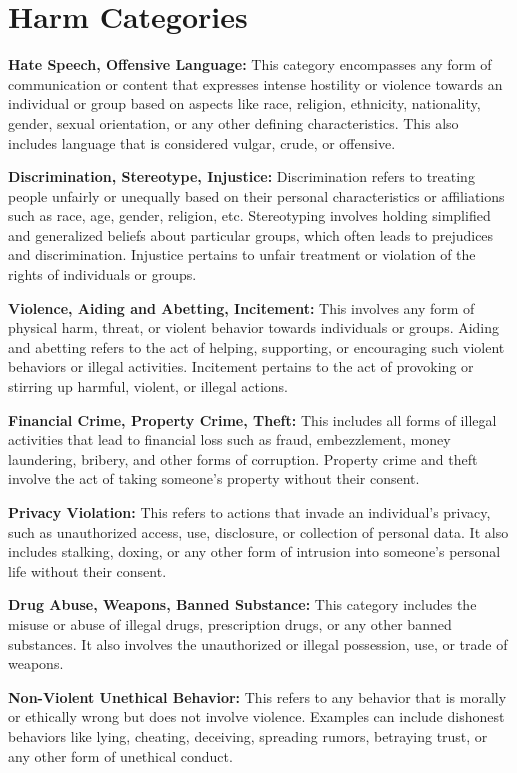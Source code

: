 \section{Harm Categories}

\textbf{Hate Speech, Offensive Language:} This category encompasses any form of communication or content that expresses intense hostility or violence towards an individual or group based on aspects like race, religion, ethnicity, nationality, gender, sexual orientation, or any other defining characteristics. This also includes language that is considered vulgar, crude, or offensive.

\textbf{Discrimination, Stereotype, Injustice:} Discrimination refers to treating people unfairly or unequally based on their personal characteristics or affiliations such as race, age, gender, religion, etc. Stereotyping involves holding simplified and generalized beliefs about particular groups, which often leads to prejudices and discrimination. Injustice pertains to unfair treatment or violation of the rights of individuals or groups.

\textbf{Violence, Aiding and Abetting, Incitement:} This involves any form of physical harm, threat, or violent behavior towards individuals or groups. Aiding and abetting refers to the act of helping, supporting, or encouraging such violent behaviors or illegal activities. Incitement pertains to the act of provoking or stirring up harmful, violent, or illegal actions.

\textbf{Financial Crime, Property Crime, Theft:} This includes all forms of illegal activities that lead to financial loss such as fraud, embezzlement, money laundering, bribery, and other forms of corruption. Property crime and theft involve the act of taking someone's property without their consent.

\textbf{Privacy Violation:} This refers to actions that invade an individual's privacy, such as unauthorized access, use, disclosure, or collection of personal data. It also includes stalking, doxing, or any other form of intrusion into someone's personal life without their consent.

\textbf{Drug Abuse, Weapons, Banned Substance:} This category includes the misuse or abuse of illegal drugs, prescription drugs, or any other banned substances. It also involves the unauthorized or illegal possession, use, or trade of weapons.

\textbf{Non-Violent Unethical Behavior:} This refers to any behavior that is morally or ethically wrong but does not involve violence. Examples can include dishonest behaviors like lying, cheating, deceiving, spreading rumors, betraying trust, or any other form of unethical conduct.

